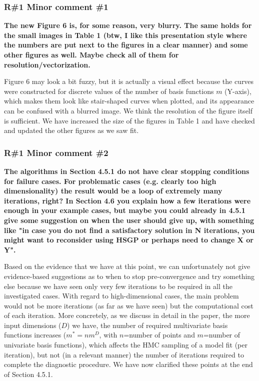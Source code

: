 \documentclass[11pt]{report}
\begin{document}
\subsubsection*{R\#1 Minor comment \#1}

\textbf{The new Figure 6 is, for some reason, very blurry. The same holds for the small images in Table 1 (btw, I like this presentation style where the numbers are put next to the figures in a clear manner) and some other figures as well. Maybe check all of them for resolution/vectorization.}

Figure 6 may look a bit fuzzy, but it is actually a visual effect because the curves were constructed for discrete values of the number of basis functions $m$ (Y-axis), which makes them look like stair-shaped curves when plotted, and its appearance can be confused with a blurred image. We think the resolution of the figure itself is sufficient. We have increased the size of the figures in Table 1 and have checked and updated the other figures as we saw fit.



\subsubsection*{R\#1 Minor comment \#2}

\textbf{The algorithms in Section 4.5.1 do not have clear stopping conditions for failure cases.  For problematic cases (e.g. clearly too high dimensionality) the result would be a loop of  extremely many iterations, right? In Section 4.6 you explain how a few iterations were enough in your example cases, but maybe you could already in 4.5.1 give some suggestion on when the user should give up, with something like "in case you do not find a satisfactory solution in N iterations, you might want to reconsider using HSGP or perhaps need to change X or Y".}

Based on the evidence that we have at this point, we can unfortunately not give evidence-based suggestions as to when to stop pre-convergence and try something else because we have seen only very few iterations to be required in all the investigated cases. With regard to high-dimensional cases, the main problem would not be more iterations (as far as we have seen) but the computational cost of each iteration. More concretely, as we discuss in detail in the paper, the more input dimensions ($D$) we have, the number of required multivariate basis functions increases ($m^*=nm^D$, with $n$=number of points and $m$=number of univariate basis functions), which affects the HMC sampling of a model fit (per iteration), but not (in a relevant manner) the number of iterations required to complete the diagnostic procedure. We have now clarified these points at the end of Section 4.5.1.
\end{document}
